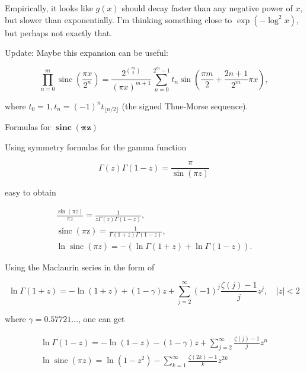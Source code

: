 \documentclass[10pt]{article}
\begin{document}
Empirically, it looks like $g(x)$ should decay faster than any negative power of $x$, but slower than exponentially. I'm thinking something close to $\exp \left(-\log ^{2} x\right)$, but perhaps not exactly that.

Update: Maybe this expansion can be useful:


\begin{equation*}
\prod_{n=0}^{m} \operatorname{sinc}\left(\frac{\pi x}{2^{n}}\right)=\frac{2^{\binom{m}{2}}}{(\pi x)^{m+1}} \sum_{n=0}^{2^{m}-1} t_{n} \sin \left(\frac{\pi m}{2}+\frac{2 n+1}{2^{m}} \pi x\right), \tag{4}
\end{equation*}


where $t_{0}=1, t_{n}=(-1)^{n} t_{\lfloor n / 2\rfloor}$ (the signed Thue-Morse sequence).

Formulas for $\boldsymbol{\operatorname { s i n c }}(\boldsymbol{\pi} \mathbf{z})$

Using symmetry formulas for the gamma function


\begin{equation*}
\Gamma(z) \Gamma(1-z)=\frac{\pi}{\sin (\pi z)} \tag{2}
\end{equation*}


easy to obtain


\begin{gather*}
\frac{\sin (\pi z)}{\pi z}=\frac{1}{z \Gamma(z) \Gamma(1-z)}, \\
\operatorname{sinc}(\pi \mathrm{z})=\frac{1}{\Gamma(1+z) \Gamma(1-z)},  \tag{3}\\
\ln \operatorname{sinc}(\pi z)=-(\ln \Gamma(1+z)+\ln \Gamma(1-z)) . \tag{4}
\end{gather*}


Using the Maclaurin series in the form of


\begin{equation*}
\ln \Gamma(1+z)=-\ln (1+z)+(1-\gamma) z+\sum_{j=2}^{\infty}(-1)^{j} \frac{\zeta(j)-1}{j} z^{j}, \quad|z|<2 \tag{5}
\end{equation*}


where $\gamma=0.57721 \ldots$, one can get

$$
\begin{gathered}
\ln \Gamma(1-z)=-\ln (1-z)-(1-\gamma) z+\sum_{j=2}^{\infty} \frac{\zeta(j)-1}{j} z^{n} \\
\ln \operatorname{sinc}(\pi z)=\ln \left(1-z^{2}\right)-\sum_{k=1}^{\infty} \frac{\zeta(2 k)-1}{k} z^{2 k}
\end{gathered}
$$
\end{document}
